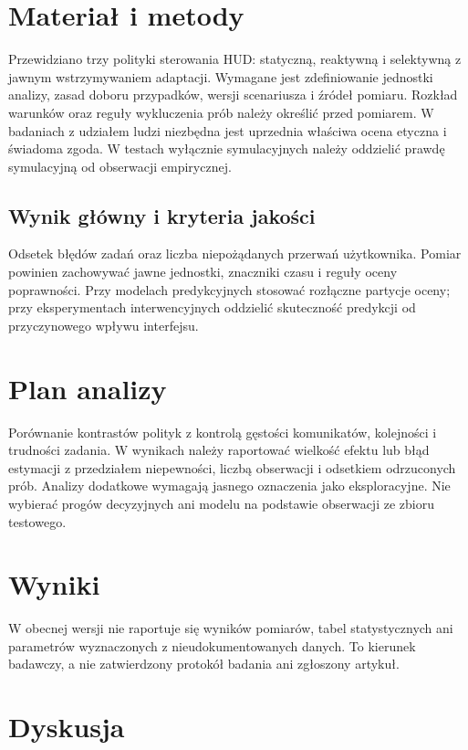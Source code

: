 \documentclass[11pt,a4paper]{article}
\begin{document}
\section{Materiał i metody}

Przewidziano trzy polityki sterowania HUD: statyczną, reaktywną i selektywną z jawnym wstrzymywaniem adaptacji. Wymagane jest zdefiniowanie jednostki analizy, zasad doboru przypadków, wersji scenariusza i źródeł pomiaru. Rozkład warunków oraz reguły wykluczenia prób należy określić przed pomiarem. W badaniach z udziałem ludzi niezbędna jest uprzednia właściwa ocena etyczna i świadoma zgoda. W testach wyłącznie symulacyjnych należy oddzielić prawdę symulacyjną od obserwacji empirycznej.

\subsection{Wynik główny i kryteria jakości}

Odsetek błędów zadań oraz liczba niepożądanych przerwań użytkownika. Pomiar powinien zachowywać jawne jednostki, znaczniki czasu i reguły oceny poprawności. Przy modelach predykcyjnych stosować rozłączne partycje oceny; przy eksperymentach interwencyjnych oddzielić skuteczność predykcji od przyczynowego wpływu interfejsu.

\section{Plan analizy}

Porównanie kontrastów polityk z kontrolą gęstości komunikatów, kolejności i trudności zadania. W wynikach należy raportować wielkość efektu lub błąd estymacji z przedziałem niepewności, liczbą obserwacji i odsetkiem odrzuconych prób. Analizy dodatkowe wymagają jasnego oznaczenia jako eksploracyjne. Nie wybierać progów decyzyjnych ani modelu na podstawie obserwacji ze zbioru testowego.

\section{Wyniki}

W obecnej wersji nie raportuje się wyników pomiarów, tabel statystycznych ani parametrów wyznaczonych z nieudokumentowanych danych. To kierunek badawczy, a nie zatwierdzony protokół badania ani zgłoszony artykuł.

\section{Dyskusja}
\end{document}
